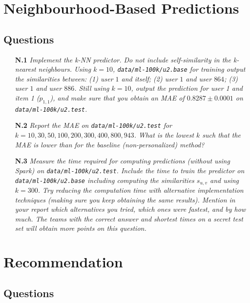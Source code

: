 \documentclass{article}
\begin{document}
\section{Neighbourhood-Based Predictions}


\subsection{Questions}
\label{section:q2}

\begin{itemize}    
        \item [\textbf{N.1}] \textit{Implement the k-NN predictor. Do not include self-similarity in the k-nearest neighbours. Using $k=10$,  \texttt{data/ml-100k/u2.base} for training output the similarities between: (1) user $1$ and itself; (2) user $1$ and user $864$; (3) user $1$ and user $886$. Still using $k=10$, output the prediction for user 1 and item 1 ($p_{1,1}$), and make sure that you obtain an MAE of $0.8287 \pm 0.0001$ on \texttt{data/ml-100k/u2.test}.} 
    
    \item [\textbf{N.2}] \textit{Report the MAE on \texttt{data/ml-100k/u2.test} for $k = {10, 30, 50, 100, 200, 300, 400, 800, 943}$. What is the lowest $k$ such that the MAE is lower than for the baseline (non-personalized) method?} 
    
     \item [\textbf{N.3}] \label{q-total-time} \textit{Measure the time required for computing predictions (without using Spark) on \texttt{data/ml-100k/u2.test}. Include the time to train the predictor on \newline \texttt{data/ml-100k/u2.base} including computing the similarities $s_{u,v}$ and using $k=300$. Try reducing the computation time with alternative implementation techniques (making sure you keep obtaining the same results). Mention in your report which alternatives you tried,  which ones were fastest, and by how much. The teams with the correct answer and shortest times on a secret test set will obtain more points on this question.}
\end{itemize}


\section{Recommendation}

\subsection{Questions}
\label{section:q4}
\end{document}
